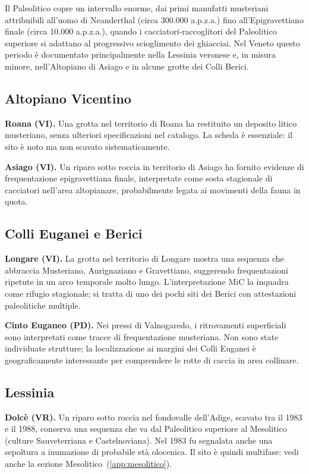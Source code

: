 Il Paleolitico copre un intervallo enorme, dai primi manufatti musteriani attribuibili all'uomo di Neanderthal (circa 300.000 a.p.z.a.) fino all'Epigravettiano finale (circa 10.000 a.p.z.a.), quando i cacciatori-raccoglitori del Paleolitico superiore si adattano al progressivo scioglimento dei ghiacciai. Nel Veneto questo periodo è documentato principalmente nella Lessinia veronese e, in misura minore, nell'Altopiano di Asiago e in alcune grotte dei Colli Berici.

\subsection{Altopiano Vicentino}

\textbf{Roana (VI).} Una grotta nel territorio di Roana ha restituito un deposito litico musteriano, senza ulteriori specificazioni nel catalogo. La scheda è essenziale: il sito è noto ma non scavato sistematicamente.

\textbf{Asiago (VI).} Un riparo sotto roccia in territorio di Asiago ha fornito evidenze di frequentazione epigravettiana finale, interpretate come sosta stagionale di cacciatori nell'area altopianare, probabilmente legata ai movimenti della fauna in quota.

\subsection{Colli Euganei e Berici}

\textbf{Longare (VI).} La grotta nel territorio di Longare mostra una sequenza che abbraccia Musteriano, Aurignaziano e Gravettiano, suggerendo frequentazioni ripetute in un arco temporale molto lungo. L'interpretazione MiC la inquadra come rifugio stagionale; si tratta di uno dei pochi siti dei Berici con attestazioni paleolitiche multiple.

\textbf{Cinto Euganeo (PD).} Nei pressi di Valnogaredo, i ritrovamenti superficiali sono interpretati come tracce di frequentazione musteriana. Non sono state individuate strutture; la localizzazione ai margini dei Colli Euganei è geograficamente interessante per comprendere le rotte di caccia in area collinare.

\subsection{Lessinia}

\textbf{Dolcè (VR).} Un riparo sotto roccia nel fondovalle dell'Adige, scavato tra il 1983 e il 1988, conserva una sequenza che va dal Paleolitico superiore al Mesolitico (culture Sauveterriana e Castelnoviana). Nel 1983 fu segnalata anche una sepoltura a inumazione di probabile età olocenica. Il sito è quindi multifase: vedi anche la sezione Mesolitico~(\ref{app:mesolitico}).


